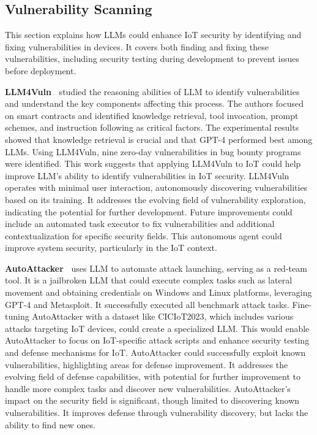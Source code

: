 \subsection{ Vulnerability Scanning}
%
This section explains how LLMs could enhance IoT security by identifying and fixing vulnerabilities in devices.
It covers both finding and fixing these vulnerabilities, including security testing during development to prevent issues before deployment.

\smallskip
\noindent \textbf{LLM4Vuln~\citet{sun2024llm4vuln}} studied the reasoning abilities of LLM to identify vulnerabilities and understand the key components affecting this process.
The authors focused on smart contracts and identified knowledge retrieval, tool invocation, prompt schemes, and instruction following as critical factors.
The experimental results showed that knowledge retrieval is crucial and that GPT-4 performed best among LLMs.
Using LLM4Vuln, nine zero-day vulnerabilities in bug bounty programs were identified.
This work suggests that applying LLM4Vuln to IoT could help improve LLM’s ability to identify vulnerabilities in IoT security.
LLM4Vuln operates with minimal user interaction, autonomously discovering vulnerabilities based on its training.
It addresses the evolving field of vulnerability exploration, indicating the potential for further development.
Future improvements could include an automated task executor to fix vulnerabilities and additional contextualization for specific security fields.
This autonomous agent could improve system security, particularly in the IoT context.

\smallskip
\noindent \textbf{AutoAttacker~\citet{xu2024autoattacker}} uses LLM to automate attack launching, serving as a red-team tool.
It is a jailbroken LLM that could execute complex tasks such as lateral movement and obtaining credentials on Windows and Linux platforms, leveraging GPT-4 and Metasploit.
It successfully executed all benchmark attack tasks.
Fine-tuning AutoAttacker with a dataset like CICIoT2023, which includes various attacks targeting IoT devices, could create a specialized LLM.
This would enable AutoAttacker to focus on IoT-specific attack scripts and enhance security testing and defense mechanisms for IoT.
AutoAttacker could successfully exploit known vulnerabilities, highlighting areas for defense improvement.
It addresses the evolving field of defense capabilities, with potential for further improvement to handle more complex tasks and discover new vulnerabilities.
AutoAttacker's impact on the security field is significant, though limited to discovering known vulnerabilities.
It improves defense through vulnerability discovery, but lacks the ability to find new ones.

